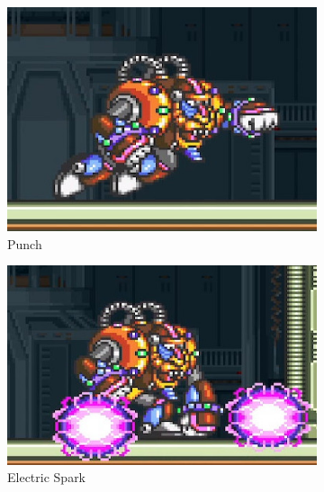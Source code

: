 \begin{figure}[htp]
	\centering
	\begin{subfigure}{0.4\linewidth}
		\centering
		\includegraphics[width=\linewidth]{figures/X1/Spark_mandrill/Mandrill_punch.jpg}
		\caption{Punch}
	\end{subfigure}
	\begin{subfigure}{0.45\linewidth}
		\centering
		\includegraphics[width=\linewidth]{figures/X1/Spark_mandrill/Mandrill_spark.jpg}
		\caption{Electric Spark}
	\end{subfigure}
	\begin{subfigure}[t]{0.4\linewidth}
		\centering

\end{subfigure}
\end{figure}
